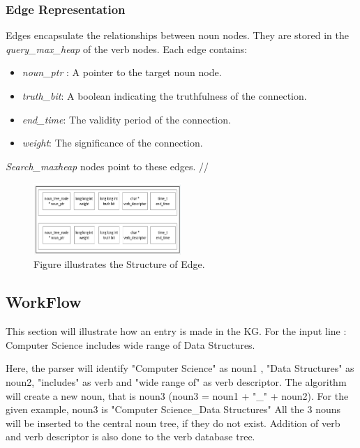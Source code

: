 \documentclass[conference]{IEEEtran}
\begin{document}
\subsubsection{Edge Representation}
Edges encapsulate the relationships between noun nodes. They are stored in the \textit{query\_max\_heap} of the verb nodes. Each edge contains:
\begin{itemize}

    \item \textit{noun\_ptr} : A pointer to the target noun node.
    \item \textit{truth\_bit}: A boolean indicating the truthfulness of the connection.
    \item \textit{end\_time}: The validity period of the connection.
    \item \textit{weight}: The significance of the connection.
\end{itemize}

\textit{Search\_maxheap} nodes point to these edges.
//




\begin{figure}[htbp]
\centerline{\includegraphics[width=0.5\textwidth]{fig_4_1.png}}
\caption{Figure illustrates the Structure of Edge.}
\label{fig}
\end{figure}



\subsection*{WorkFlow}

This section will illustrate how an entry is made in the KG. 
For the input line : Computer Science includes wide range of Data Structures.

Here, the parser will identify "Computer Science" as noun1 , "Data Structures" as noun2, "includes" as verb and "wide range of" as verb descriptor.
The algorithm will create a new noun, that is noun3 (noun3 = noun1 + "\_" + noun2). For the given example, noun3 is "Computer Science\_Data Structures" 
All the 3 nouns will be inserted to the central noun tree, if they do not exist.
Addition of verb and verb descriptor is also done to the verb database tree.
\end{document}
